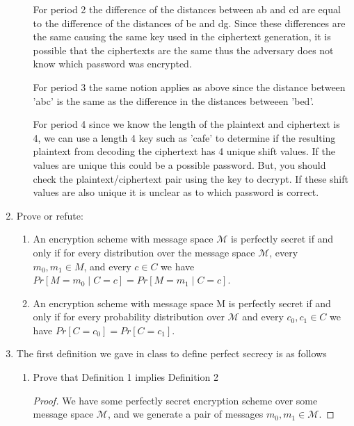 \documentclass{article}
\begin{document}
\begin{enumerate}
\begin{enumerate}
        For period 2 the difference of the distances between ab and cd are equal to the difference of the distances of be and dg. Since these differences are the same causing the same key used in the ciphertext generation,  it is possible that the ciphertexts are the same thus the adversary does not know which password was encrypted. 

       
        For period 3 the same notion applies as above since the distance between 'abc' is the same as the difference in the distances betweeen 'bed'.


        For period 4 since we know the length of the plaintext and ciphertext is 4, we can use a length 4 key such as 'cafe' to determine if the resulting plaintext from decoding the ciphertext has 4 unique shift values. If the values are unique this could be a possible password. But, you should check the plaintext/ciphertext pair using the key to decrypt. If these shift values are also unique it is unclear as to which password is correct. 

    \end{enumerate}
  \item Prove or refute:
    \begin{enumerate}
      \item An encryption scheme with message space $\mathcal{M}$ is perfectly
        secret if and only if for every distribution over the message space 
        $\mathcal{M}$, every $m_0, m_1 \in M$, and every $c \in C$ we have 
        $Pr\left[M = m_0 \mid C = c\right] = Pr\left[M = m_1 \mid C = c\right]$.

      \item An encryption scheme with message space M is perfectly secret if and 
        only if for every probability distribution over $\mathcal{M}$ and every
        $c_0, c_1 \in C$ 
        we have $Pr\left[C = c_0\right] = Pr\left[C = c_1\right]$.
    \end{enumerate}
  \item The first definition we gave in class to define perfect secrecy is as follows
    \begin{enumerate}
      \item Prove that Definition 1 implies Definition 2

        \begin{proof}
          We have some perfectly secret encryption scheme over some message 
          space $\mathcal{M}$, and we generate a pair of messages 
          $m_0, m_1 \in \mathcal{M}$.


\end{proof}
\end{enumerate}
\end{enumerate}
\end{document}
